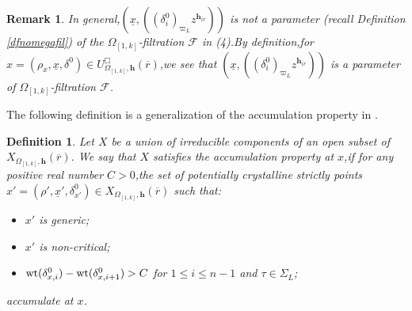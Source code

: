 \documentclass[SecEq,CM,GP]{degruyter-crelle} %
\theoremstyle{plain}
\newtheorem{dfn}[thm]{Definition}
\newtheorem{rmk}[thm]{Remark}
\newcommand{\defvar}{{ X_{\omepik,\mathbf{{h}}}(\overline{r})}}
\newcommand{\omepik}{\Omega_{[1,k]}}
\newcommand{\undelram}{{\delta^0}}
\newcommand{\wt}{{\rm wt}}
\newcommand{\bh}{{\mathbf{h}}}
\newcommand{\cF}{\mathcal F}
\begin{document}
\begin{rmk}In general,\;$(\underline{x},((\delta_i^0)_{\varpi_L}z^{\bh_{ir}}))$ is not a parameter (recall Definition \ref{dfnomegafil}) of the $\omepik$-filtration $\cF$ in (4).\;By definition,\;for $x=(\rho_x,\underline{x},\undelram)\in U^\Box_{\omepik,\mathbf{{h}}}(\overline{r})$,\;we see that $(\underline{x},((\delta_i^0)_{\varpi_L}z^{\bh_{ir}}))$ is a parameter of  $\omepik$-filtration  $\cF$.\;
\end{rmk}

The following definition is a generalization of the accumulation property in \cite[Definition 2.11]{breuil2017smoothness}.\;
\begin{dfn}\label{accum}Let $X$ be a union of irreducible components of an open subset of $\defvar$. We say that $X$ satisfies the accumulation property at $x$,\;if for any positive real number $C>0$,\;the set of potentially crystalline strictly points $x'=(\rho',\underline{x}',\delta^0_{x'})\in \defvar$ such that:
\begin{itemize}
	\item $x'$ is generic;
	\item $x'$ is non-critical;
	\item $\wt(\delta_{x,i}^0)-\wt(\delta_{x,i+1}^0)>C$ for $1\leq i\leq n-1$ and $\tau\in \Sigma_L$;
\end{itemize}
accumulate at $x$.\;
\end{dfn}
\end{document}

